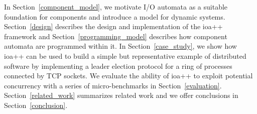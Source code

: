 In Section~\ref{component_model}, we motivate I/O automata as a suitable foundation for components and introduce a model for dynamic systems.
Section~\ref{design} describes the design and implementation of the ioa++ framework and Section~\ref{programming_model} describes how component automata are programmed within it.
In Section~\ref{case_study}, we show how ioa++ can be used to build a simple but representative example of distributed software by implementing a leader election protocol for a ring of processes connected by TCP sockets.
We evaluate the ability of ioa++ to exploit potential concurrency with a series of micro-benchmarks in Section~\ref{evaluation}.
Section~\ref{related_work} summarizes related work and we offer conclusions in Section~\ref{conclusion}.


